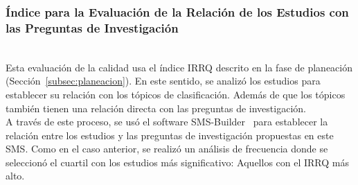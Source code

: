 \subsubsection{Índice para la Evaluación de la Relación de los Estudios con las Preguntas de Investigación}
\mbox{}\\
Esta evaluación de la calidad usa el índice IRRQ descrito en la fase de planeación (Sección~\ref{subsec:planeacion}). En este sentido, se analizó los estudios para establecer su relación con los tópicos de clasificación. Además de que los tópicos también tienen una relación directa con las preguntas de investigación.\\
A través de este proceso, se usó el software SMS-Builder~\cite{candela2020smsbuilder} para establecer la relación entre los estudios y las preguntas de investigación propuestas en este SMS. Como en el caso anterior, se realizó un análisis de frecuencia donde se seleccionó el cuartil con los estudios más significativo: Aquellos con el IRRQ más alto.